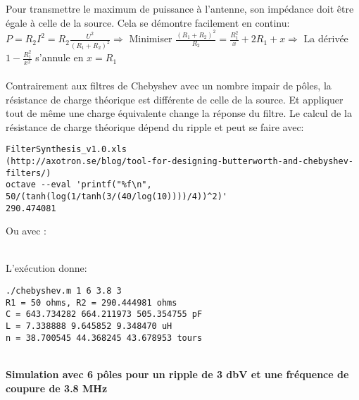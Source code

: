 \documentclass[a4paper]{article}
\def\plotscale{0.7}
\begin{document}
Pour transmettre le maximum de puissance à l'antenne, son impédance doit
être égale à celle de la source. Cela se démontre facilement en continu:\\
$P = R_2I^2 = R_2\frac{U^2}{(R_1+R_2)^2} \Longrightarrow$
Minimiser $\frac{(R_1+R_2)^2}{R_2} = \frac{R_1^2}{x}+2R_1+x \Longrightarrow$
La dérivée $1-\frac{R_1^2}{x^2}$ s'annule en $x = R_1$\\
\\
Contrairement aux filtres de Chebyshev avec un nombre impair de pôles,
la résistance de charge théorique est différente de celle de la source.
Et appliquer tout de même une charge équivalente change la réponse du
filtre. Le calcul de la résistance de charge théorique dépend du ripple
et peut se faire avec:\\
\begin{verbatim}
FilterSynthesis_v1.0.xls
(http://axotron.se/blog/tool-for-designing-butterworth-and-chebyshev-filters/)
octave --eval 'printf("%f\n", 50/(tanh(log(1/tanh(3/(40/log(10))))/4))^2)'
290.474081
\end{verbatim}
Ou avec :\\
\hspace*{1cm}
\footnotesize
\begin{minipage}{9cm}

\end{minipage}
\begin{minipage}{9cm}

\end{minipage}\\
\normalsize
\newpage
L'exécution donne:
\begin{verbatim}
./chebyshev.m 1 6 3.8 3
R1 = 50 ohms, R2 = 290.444981 ohms
C = 643.734282 664.211973 505.354755 pF
L = 7.338888 9.645852 9.348470 uH
n = 38.700545 44.368245 43.678953 tours
\end{verbatim}
~\\
\textbf{Simulation avec 6 pôles pour un ripple de 3 dbV et une
fréquence de coupure de 3.8 \si{\mega\hertz}}\\
\\
\end{document}
